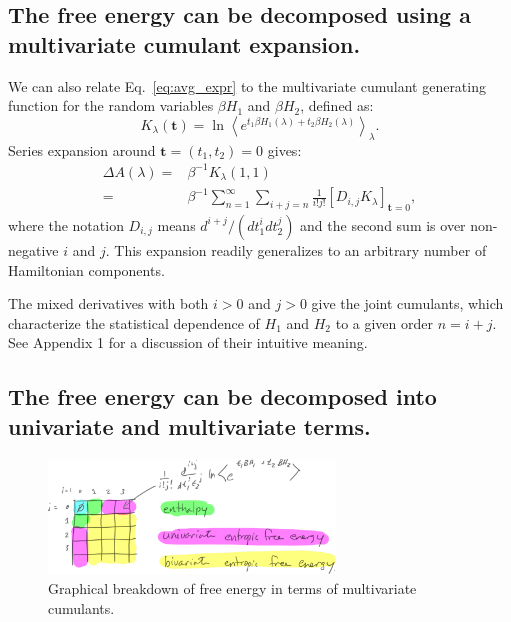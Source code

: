 \documentclass{article}
\let\vec\mathbf
\begin{document}
\subsection{The free energy can be decomposed using a multivariate cumulant expansion.}

We can also relate Eq.~\ref{eq:avg_expr} to the multivariate cumulant generating function for the random variables $\beta H_1$ and $\beta H_2$, defined as:
\begin{equation}
K_\lambda(\vec t) =
	\ln \left\langle 
    	e^{t_1 \beta H_1(\lambda) + t_2 \beta H_2(\lambda)}
    \right\rangle_\lambda.
\end{equation}
Series expansion around $\vec t = (t_1, t_2) = 0$ gives:
\begin{align}
\Delta A(\lambda) =& \beta^{-1} K_\lambda(1, 1) \nonumber\\
                  =& \beta^{-1} \sum_{n=1}^{\infty}
	        			\sum_{i+j=n}
            			\frac{1}{i!j!}\left[ D_{i,j} K_\lambda\right]_{\vec t=0},
\label{eq:mult_expansion}
\end{align}
where the notation $D_{i,j}$ means $d^{i+j} /(d t_1^i d t_2^j)$ and the second sum is over non-negative $i$ and $j$. This expansion readily generalizes to an arbitrary number of Hamiltonian components. 

The mixed derivatives with both $i>0$ and $j>0$ give the joint cumulants, which characterize the statistical dependence of $H_1$ and $H_2$ to a given order $n=i+j$. See Appendix 1 for a discussion of their intuitive meaning.




\subsection{The free energy can be decomposed into univariate and multivariate terms.}

\begin{figure}[tb]
\centering
\includegraphics[width=3in]{figure2.pdf}
\caption{Graphical breakdown of free energy in terms of multivariate cumulants.}
\label{fig:2D}
\end{figure}
\end{document}

